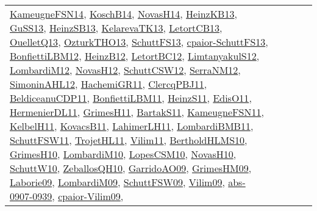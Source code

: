 {\begin{longtable}{lp{3cm}>{\raggedright}p{6cm}>{\raggedright}p{6cm}p{8cm}}
\href{articles/KameugneFSN14.pdf}{KameugneFSN14}\cite{KameugneFSN14}, \href{papers/KoschB14.pdf}{KoschB14}\cite{KoschB14}, \href{articles/NovasH14.pdf}{NovasH14}\cite{NovasH14}, \href{papers/HeinzKB13.pdf}{HeinzKB13}\cite{HeinzKB13}, \href{papers/GuSS13.pdf}{GuSS13}\cite{GuSS13}, \href{articles/HeinzSB13.pdf}{HeinzSB13}\cite{HeinzSB13}, \href{papers/KelarevaTK13.pdf}{KelarevaTK13}\cite{KelarevaTK13}, \href{papers/LetortCB13.pdf}{LetortCB13}\cite{LetortCB13}, \href{papers/OuelletQ13.pdf}{OuelletQ13}\cite{OuelletQ13}, \href{articles/OzturkTHO13.pdf}{OzturkTHO13}\cite{OzturkTHO13}, \href{papers/SchuttFS13.pdf}{SchuttFS13}\cite{SchuttFS13}, \href{papers/cpaior-SchuttFS13.pdf}{cpaior-SchuttFS13}\cite{cpaior-SchuttFS13}, \href{papers/BonfiettiLBM12.pdf}{BonfiettiLBM12}\cite{BonfiettiLBM12}, \href{papers/HeinzB12.pdf}{HeinzB12}\cite{HeinzB12}, \href{papers/LetortBC12.pdf}{LetortBC12}\cite{LetortBC12}, \href{articles/LimtanyakulS12.pdf}{LimtanyakulS12}\cite{LimtanyakulS12}, \href{articles/LombardiM12.pdf}{LombardiM12}\cite{LombardiM12}, \href{articles/NovasH12.pdf}{NovasH12}\cite{NovasH12}, \href{papers/SchuttCSW12.pdf}{SchuttCSW12}\cite{SchuttCSW12}, \href{papers/SerraNM12.pdf}{SerraNM12}\cite{SerraNM12}, \href{papers/SimoninAHL12.pdf}{SimoninAHL12}\cite{SimoninAHL12}, \href{articles/HachemiGR11.pdf}{HachemiGR11}\cite{HachemiGR11}, \href{papers/ClercqPBJ11.pdf}{ClercqPBJ11}\cite{ClercqPBJ11}, \href{articles/BeldiceanuCDP11.pdf}{BeldiceanuCDP11}\cite{BeldiceanuCDP11}, \href{papers/BonfiettiLBM11.pdf}{BonfiettiLBM11}\cite{BonfiettiLBM11}, \href{papers/HeinzS11.pdf}{HeinzS11}\cite{HeinzS11}, \href{papers/EdisO11.pdf}{EdisO11}\cite{EdisO11}, \href{papers/HermenierDL11.pdf}{HermenierDL11}\cite{HermenierDL11}, \href{papers/GrimesH11.pdf}{GrimesH11}\cite{GrimesH11}, \href{articles/BartakS11.pdf}{BartakS11}\cite{BartakS11}, \href{papers/KameugneFSN11.pdf}{KameugneFSN11}\cite{KameugneFSN11}, \href{articles/KelbelH11.pdf}{KelbelH11}\cite{KelbelH11}, \href{articles/KovacsB11.pdf}{KovacsB11}\cite{KovacsB11}, \href{papers/LahimerLH11.pdf}{LahimerLH11}\cite{LahimerLH11}, \href{papers/LombardiBMB11.pdf}{LombardiBMB11}\cite{LombardiBMB11}, \href{articles/SchuttFSW11.pdf}{SchuttFSW11}\cite{SchuttFSW11}, \href{articles/TrojetHL11.pdf}{TrojetHL11}\cite{TrojetHL11}, \href{papers/Vilim11.pdf}{Vilim11}\cite{Vilim11}, \href{papers/BertholdHLMS10.pdf}{BertholdHLMS10}\cite{BertholdHLMS10}, \href{papers/GrimesH10.pdf}{GrimesH10}\cite{GrimesH10}, \href{papers/LombardiM10.pdf}{LombardiM10}\cite{LombardiM10}, \href{articles/LopesCSM10.pdf}{LopesCSM10}\cite{LopesCSM10}, \href{articles/NovasH10.pdf}{NovasH10}\cite{NovasH10}, \href{papers/SchuttW10.pdf}{SchuttW10}\cite{SchuttW10}, \href{articles/ZeballosQH10.pdf}{ZeballosQH10}\cite{ZeballosQH10}, \href{articles/GarridoAO09.pdf}{GarridoAO09}\cite{GarridoAO09}, \href{papers/GrimesHM09.pdf}{GrimesHM09}\cite{GrimesHM09}, \href{papers/Laborie09.pdf}{Laborie09}\cite{Laborie09}, \href{papers/LombardiM09.pdf}{LombardiM09}\cite{LombardiM09}, \href{papers/SchuttFSW09.pdf}{SchuttFSW09}\cite{SchuttFSW09}, \href{papers/Vilim09.pdf}{Vilim09}\cite{Vilim09}, \href{articles/abs-0907-0939.pdf}{abs-0907-0939}\cite{abs-0907-0939}, \href{papers/cpaior-Vilim09.pdf}{cpaior-Vilim09}\cite{cpaior-Vilim09}, 
\end{longtable}}
